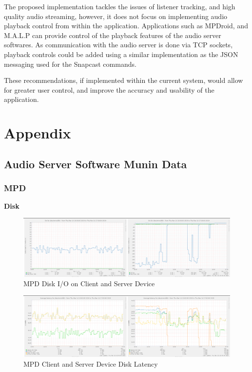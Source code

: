 \documentclass[11pt,a4paper,headinclude=false,footinclude=false]{scrreprt}
\begin{document}
The proposed implementation tackles the issues of listener tracking, and
high quality audio streaming, however, it does not focus on implementing
audio playback control from within the application. Applications such as
MPDroid, and M.A.L.P can provide control of the playback features of the
audio server softwares\cite{mpdroid}\cite{malp}. As communication with
the audio server is done via TCP sockets, playback controls could be
added using a similar implementation as the JSON messaging used for the
Snapcast commands.

These recommendations, if implemented within the current system, would
allow for greater user control, and improve the accuracy and usability
of the application.

\chapter{\texorpdfstring{Appendix
\label{Appendix}}{Appendix }}\label{appendix}

\section{\texorpdfstring{Audio Server Software Munin Data
\label{MuninData}}{Audio Server Software Munin Data }}\label{audio-server-software-munin-data}

\subsection{MPD}\label{mpd-2}

\textbf{Disk}

\begin{figure}[H]
\includegraphics{ResultsAndAnalysis/MPDServerTestImages/005MPDDiskIO.png}
\centering
\caption{MPD Disk I/O on Client and Server Device}
\label{MPDDiskIO}
\end{figure}

\begin{figure}[H]
\includegraphics{ResultsAndAnalysis/MPDServerTestImages/006MPDDiskLatency.png}
\centering
\caption{MPD Client and Server Device Disk Latency}
\label{MPDDiskLatency}
\end{figure}
\end{document}
